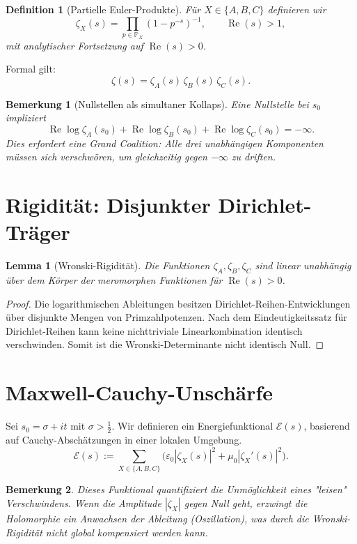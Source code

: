 \documentclass[11pt]{article}
\newtheorem{lemma}{Lemma}
\newtheorem{definition}{Definition}
\newtheorem{remark}{Bemerkung}
\newcommand{\Rea}{\operatorname{Re}}
\newcommand{\zA}{\zeta_A}
\newcommand{\zB}{\zeta_B}
\newcommand{\zC}{\zeta_C}
\newcommand{\Pcal}{\mathbb P}
\begin{document}
\begin{definition}[Partielle Euler-Produkte]
Für $X\in\{A,B,C\}$ definieren wir
\[
\zeta_X(s)=\prod_{p\in\Pcal_X}(1-p^{-s})^{-1},
\qquad \Rea(s)>1,
\]
mit analytischer Fortsetzung auf $\Rea(s)>0$.
\end{definition}

Formal gilt:
\[
\zeta(s)=\zA(s)\,\zB(s)\,\zC(s).
\]

\begin{remark}[Nullstellen als simultaner Kollaps]
Eine Nullstelle bei $s_0$ impliziert
\[
\Rea\log\zA(s_0)+\Rea\log\zB(s_0)+\Rea\log\zC(s_0)=-\infty.
\]
Dies erfordert eine \emph{Grand Coalition}: Alle drei unabhängigen Komponenten müssen sich verschwören, um gleichzeitig gegen $-\infty$ zu driften.
\end{remark}

\section{Rigidität: Disjunkter Dirichlet-Träger}

\begin{lemma}[Wronski-Rigidität]\label{lem:wronski}
Die Funktionen $\zA,\zB,\zC$ sind linear unabhängig über dem Körper der meromorphen Funktionen für $\Rea(s)>0$.
\end{lemma}

\begin{proof}
Die logarithmischen Ableitungen besitzen Dirichlet-Reihen-Entwicklungen über disjunkte Mengen von Primzahlpotenzen. Nach dem Eindeutigkeitssatz für Dirichlet-Reihen kann keine nichttriviale Linearkombination identisch verschwinden. Somit ist die Wronski-Determinante nicht identisch Null.
\end{proof}

\section{Maxwell-Cauchy-Unschärfe}

Sei $s_0=\sigma+it$ mit $\sigma>\tfrac12$. Wir definieren ein Energiefunktional $\mathcal E(s)$, basierend auf Cauchy-Abschätzungen in einer lokalen Umgebung.
\[
\mathcal E(s):=\sum_{X\in\{A,B,C\}}
\bigl(\varepsilon_0|\zeta_X(s)|^2+\mu_0|\zeta_X'(s)|^2\bigr).
\]
\begin{remark}
Dieses Funktional quantifiziert die Unmöglichkeit eines "leisen" Verschwindens. Wenn die Amplitude $|\zeta_X|$ gegen Null geht, erzwingt die Holomorphie ein Anwachsen der Ableitung (Oszillation), was durch die Wronski-Rigidität nicht global kompensiert werden kann.
\end{remark}
\end{document}
